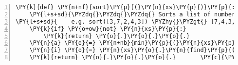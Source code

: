 \begin{Verbatim}[commandchars=\\\{\},numbers=left,firstnumber=1,stepnumber=1,codes={\catcode`\$=3\catcode`\^=7\catcode`\_=8}]
\PY{k}{def} \PY{n+nf}{sort}\PY{p}{(}\PY{n}{xs}\PY{p}{)}\PY{p}{:}
    \PY{l+s+sd}{\PYZdq{}\PYZdq{}\PYZdq{} Sorts a list of numbers.}
\PY{l+s+sd}{    e.g. sort([3,7,2,4,3]) \PYZhy{}\PYZgt{} [7,4,3,3,2] \PYZdq{}\PYZdq{}\PYZdq{}}
    \PY{k}{if} \PY{o+ow}{not} \PY{n}{xs}\PY{p}{:}
        \PY{k}{return} \PY{o}{.}\PY{o}{.}\PY{o}{.}
    \PY{n}{a} \PY{o}{=} \PY{n+nb}{min}\PY{p}{(}\PY{n}{xs}\PY{p}{)}
    \PY{n}{i} \PY{o}{=} \PY{n}{xs}\PY{o}{.}\PY{n}{find}\PY{p}{(}\PY{n}{a}\PY{p}{)}
    \PY{k}{return} \PY{o}{.}\PY{o}{.}\PY{o}{.}       \PY{c}{\PYZsh{} Hint: take slices of{\tt xs} using i}
\end{Verbatim}

